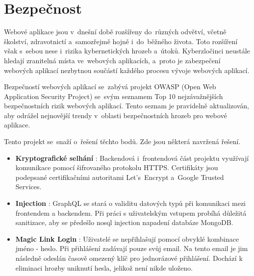 \chapter{Bezpečnost}
Webové aplikace jsou v~dnešní době rozšířeny do~různých odvětví, včetně školství, zdravotnictí a~samozřejmě hojně i~do~běžného života. Toto rozšíření však s~sebou nese i~rizika kybernetických hrozeb a~útoků. Kyberzločinci neustále hledají zranitelná místa ve~webových aplikacích, a~proto je zabezpečení webových aplikací nezbytnou součástí každého procesu vývoje webových aplikací. \par
Bezpečností webových aplikací se~zabývá projekt OWASP \cite{owasp}(Open Web Application Security Project) se~svým seznamem Top 10 nejzávažnějších \cite{owasp10} bezpečnostních rizik webových aplikací. Tento seznam je pravidelně aktualizován, aby odrážel nejnovější trendy v~oblasti bezpečnostních hrozeb pro webové aplikace.\par
Tento projekt se~snaží o~řešení těchto bodů. Zde jsou některá navržená řešení.\par

\begin{itemize}
    \item \textbf{Kryptografické selhání} \cite{crypto}: Backendová i~frontendová část projektu využívají komunikace pomocí šifrovaného protokolu HTTPS. Certifikáty jsou podepsané certifikačními autoritami Let's~Encrypt\cite{letsencrypt} a~Google Trusted Services.
    \item \textbf{Injection} \cite{nosqlinjection}: GraphQL se stará o validitu datových typů při komunikaci mezi frontendem a backendem. Při práci s uživatelským vstupem probíhá důležitá sanitizace, aby se předešlo nosql injection napadení databáze MongoDB.
    \item \textbf{Magic Link Login} \cite{magiclinklogin}: Uživatelé se nepřihlašují pomocí obvyklé kombinace jméno - heslo. Při přihlášení zadávají pouze svůj email. Na tento email je jim následně odeslán časově omezený klíč pro jednorázové přihlášení. Dochází k eliminaci hrozby uniknutí hesla, jelikož není nikde uloženo.
\end{itemize}